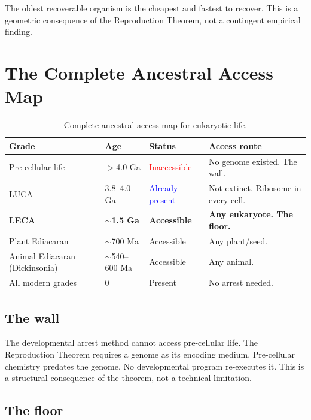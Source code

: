 \documentclass[12pt, a4paper]{article}
\theoremstyle{definition}
\theoremstyle{remark}
\begin{document}
\noindent The oldest recoverable organism is the cheapest
and fastest to recover. This is a geometric consequence of
the Reproduction Theorem, not a contingent empirical finding.

\section{The Complete Ancestral Access Map}

\begin{table}[H]
\centering
\caption{Complete ancestral access map for eukaryotic life.}
\label{tab:access}
\begin{tabularx}{\textwidth}{lXlX}
\toprule
\textbf{Grade} & \textbf{Age} &
\textbf{Status} & \textbf{Access route} \\
\midrule
Pre-cellular life & $>$4.0 Ga
  & \textcolor{red}{Inaccessible}
  & No genome existed. The wall. \\
LUCA & 3.8--4.0 Ga
  & \textcolor{blue}{Already present}
  & Not extinct. Ribosome in every cell. \\
\textbf{LECA} & \textbf{$\sim$1.5 Ga}
  & \textbf{\textcolor{green!60!black}{Accessible}}
  & \textbf{Any eukaryote. The floor.} \\
Plant Ediacaran & $\sim$700 Ma
  & \textcolor{green!60!black}{Accessible}
  & Any plant/seed. \\
Animal Ediacaran (Dickinsonia) & $\sim$540--600 Ma
  & \textcolor{green!60!black}{Accessible}
  & Any animal. \\
All modern grades & 0
  & Present
  & No arrest needed. \\
\bottomrule
\end{tabularx}
\end{table}

\subsection{The wall}

The developmental arrest method cannot access pre-cellular
life. The Reproduction Theorem requires a genome as its
encoding medium. Pre-cellular chemistry predates the genome.
No developmental program re-executes it. This is a
structural consequence of the theorem, not a technical
limitation.

\subsection{The floor}
\end{document}
